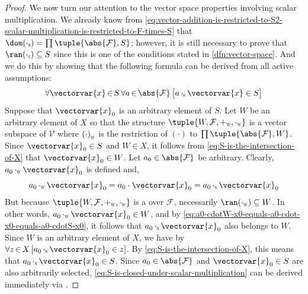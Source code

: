 \begin{proof}
    \vspace{0.3cm}
    \noindent
    We now turn our attention to the vector space properties involving scalar multiplication.
    We already know from \eqref{eq:vector-addition-is-restricted-to-S2-scalar-multiplication-is-restricted-to-F-times-S} that 
    \( \dom (\smallsubscript{\cdot}{S}) = \prod \tuple{\abs{\mathcal{F}}, S} \); however, it is still necessary to prove that
    \( \ran (\smallsubscript{\cdot}{S}) \subseteq S \) since this is one of the conditions stated in \cref{dfn:vector-space}.
    And we do this by showing that the following formula can be derived from all active assumptions:
    \begin{equation}
        \label{eq:S-is-closed-under-scalar-multiplication}
        \forall \vectorvar{x}\,{\in}\,S \, \forall a\,{\in}\,\abs{\mathcal{F}} \,
        \big[ a \, \smallsubscript{\cdot}{S} \, \vectorvar{x} \in S \big]
    \end{equation}
    Suppose that \( \vectorvar{x}_{0} \) is an arbitrary element of \( S \). Let \( W \) be an arbitrary element of \( X \) so that
    the structure \( \tuple{W, \mathcal{F}, \smallsubscript{+}{W}, \smallsubscript{\cdot}{W} } \) is a vector subspace of \( \mathcal{V} \)
    where \( \smallsubscript{(\cdot)}{W} \) is the restriction of \( (\cdot) \) to \( \prod \tuple{\abs{\mathcal{F}}, W} \).
    Since \( \vectorvar{x}_{0} \in S \) and \( W \in X \), it follows from \eqref{eq:S-is-the-intersection-of-X} that \( \vectorvar{x}_{0} \in W \).
    Let \( a_{0} \in \abs{\mathcal{F}} \) be arbitrary. Clearly, \( a_{0} \, \smallsubscript{\cdot}{W} \, \vectorvar{x}_{0} \) is defined and,
    \begin{equation}
        \label{eq:a0-cdotW-x0-equals-a0-cdot-x0-equals-a0-cdotS-x0}
        a_{0} \, \smallsubscript{\cdot}{W} \, \vectorvar{x}_{0} = a_{0} \cdot \vectorvar{x}_{0}
        = a_{0} \, \smallsubscript{\cdot}{S} \, \vectorvar{x}_{0}
    \end{equation}
    But because \( \tuple{W, \mathcal{F}, \smallsubscript{+}{W}, \smallsubscript{\cdot}{W}} \) is a  over \( \mathcal{F} \),
    necessarily \( \ran (\smallsubscript{\cdot}{W}) \subseteq W \). In other words, \( a_{0} \, \smallsubscript{\cdot}{W} \, \vectorvar{x}_{0} \in W \), and by
    \eqref{eq:a0-cdotW-x0-equals-a0-cdot-x0-equals-a0-cdotS-x0}, it follows that \( a_{0} \, \smallsubscript{\cdot}{S} \, \vectorvar{x}_{0} \) also belongs to \( W \).
    Since \( W \) is an arbitrary element of \( X \), we have by 
    \( \forall z\,{\in}\,X \, \mleft[ a_{0} \, \smallsubscript{\cdot}{S} \, \vectorvar{x}_{0} \in z \mright] \).
    By \eqref{eq:S-is-the-intersection-of-X}, this means that \( a_{0} \, \smallsubscript{\cdot}{S} \, \vectorvar{x}_{0} \in S \).
    Since \( a_{0} \in \abs{\mathcal{F}} \) and \( \vectorvar{x}_{0} \in S \) are also arbitrarily selected,
    \eqref{eq:S-is-closed-under-scalar-multiplication} can be derived immediately via .


\end{proof}
